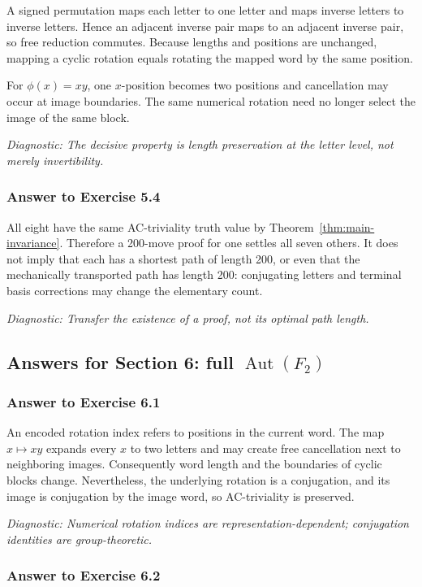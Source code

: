 \documentclass[11pt]{article}
\theoremstyle{definition}
\theoremstyle{remark}
\newcommand{\Aut}{\operatorname{Aut}}
\newcommand{\diagnostic}[1]{\par\smallskip\textit{Diagnostic: #1}}
\begin{document}
A signed permutation maps each letter to one letter and maps inverse
letters to inverse letters.  Hence an adjacent inverse pair maps to an
adjacent inverse pair, so free reduction commutes.  Because lengths and
positions are unchanged, mapping a cyclic rotation equals rotating the
mapped word by the same position.

For \(\phi(x)=xy\), one \(x\)-position becomes two positions and cancellation
may occur at image boundaries.  The same numerical rotation need no longer
select the image of the same block.

\diagnostic{The decisive property is length preservation at the letter
level, not merely invertibility.}

\subsubsection*{Answer to Exercise 5.4}

All eight have the same AC-triviality truth value by
Theorem~\ref{thm:main-invariance}.  Therefore a 200-move proof for one
settles all seven others.  It does not imply that each has a shortest path
of length 200, or even that the mechanically transported path has length
200: conjugating letters and terminal basis corrections may change the
elementary count.

\diagnostic{Transfer the existence of a proof, not its optimal path
length.}

\subsection*{Answers for Section 6: full \(\Aut(F_2)\)}

\subsubsection*{Answer to Exercise 6.1}

An encoded rotation index refers to positions in the current word.  The
map \(x\mapsto xy\) expands every \(x\) to two letters and may create free
cancellation next to neighboring images.  Consequently word length and
the boundaries of cyclic blocks change.  Nevertheless, the underlying
rotation is a conjugation, and its image is conjugation by the image word,
so AC-triviality is preserved.

\diagnostic{Numerical rotation indices are representation-dependent;
conjugation identities are group-theoretic.}

\subsubsection*{Answer to Exercise 6.2}
\end{document}

